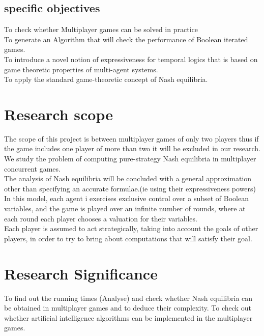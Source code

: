\documentclass[14pt, a4paper]{article}
\begin{document}
		
				
				\subsection{specific objectives}
To check whether Multiplayer games can be solved in practice\\
To generate an Algorithm that will check the performance of Boolean iterated games.\\
To introduce a novel notion of expressiveness for temporal logics that is based on game theoretic properties of multi-agent systems.\\
To apply the standard game-theoretic concept of Nash equilibria.\\

			
			\section{Research scope}
			
				The scope of this project is between multiplayer games of only two players thus if the game includes one player of more than two it will be excluded in our research.\\
	We study the problem of computing pure-strategy Nash equilibria in multiplayer concurrent games.\\
	The analysis of Nash equilibria will be concluded with a general approximation other than specifying an accurate formulae.(ie using their expressiveness powers)\\

	In this model, each agent i exercises exclusive control over a subset of Boolean variables, and the game is played over an infinite number of rounds, where at each round each player chooses a valuation for their variables.\\

	Each player is assumed to act strategically, taking into account the goals of other players,
in order to try to bring about computations that will satisfy their goal.\\

			
			\section{Research Significance}
			
				To find out the running times (Analyse) and check whether Nash equilibria can be obtained in multiplayer games and to deduce their complexity.
				To check out whether artificial intelligence algorithms can be implemented in the multiplayer 
games.
\end{document}
